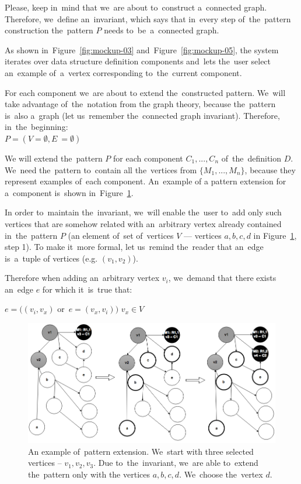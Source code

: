 Please, keep in~mind that we~are about to~construct a~connected graph. Therefore, we~define an~invariant, which says that in~every 
step of~the~pattern construction the~pattern $P$ needs to~be~a~connected graph.

As shown in~Figure~\ref{fig:mockup-03} and~Figure~\ref{fig:mockup-05},
the system iterates over data 
structure definition components and~lets the~user select an~example of~a~vertex corresponding to~the~current component.

For each component we~are about 
to extend the~constructed pattern. We~will take advantage of~the~notation from the
graph theory, because the~pattern is~also a~graph (let us~remember the~connected graph invariant).
Therefore, in~the~beginning:\\

{\centering $P = (V = \emptyset, E~= \emptyset)$ \\[0.5cm]}

We will extend the~pattern $P$ for each component $C_1, ..., C_n$ of~the~definition $D$. We~need the~pattern to~contain all the~vertices from $\{M_1 ,..., 
M_n\}$, because they represent examples of~each component. An~example of
a pattern extension for a~component is~shown in~Figure~\ref{fig:pattern-enhancement}.

In order to~maintain the~invariant, we~will enable the~user to~add only such 
vertices that are somehow related with an~arbitrary vertex already contained in~the~pattern $P$ (an element of~set of~vertices $V$ --- vertices $a,b,c,d$
in Figure~\ref{fig:pattern-enhancement}, step 1).
To make it~more formal, let us~remind the~reader that an~edge is~a~tuple 
of vertices (e.g. $(v_1,v_2)$).

Therefore when adding an~arbitrary vertex $v_i$, we~demand that there exists an~edge $e$ for which it~is~true that:

\begin{center}
{$e = ((v_i,v_x)$ or~$e = (v_x, v_i))$ \land $v_x \in V$ \\[0.5cm]}
\end{center}

\begin{figure}
	\centering
	\includegraphics[width=140mm]{img/pattern-enhancement.png}
	\caption{An example of~pattern extension. We~start with three selected vertices
	-- $v_1, v_2, v_3$. Due to~the~invariant, we~are able to~extend the~pattern only with
	the vertices $a,b,c,d$. We~choose the~vertex $d$.}
	\label{fig:pattern-enhancement}
\end{figure}

